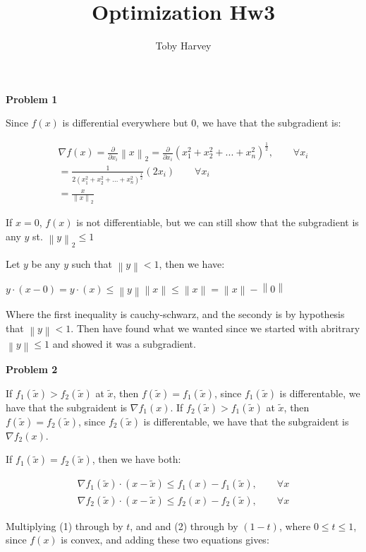 \documentclass{article}
\newcommand{\norm}[1]{\left\lVert#1\right\rVert}
\begin{document}
\title{Optimization Hw3}
\author{Toby Harvey}
\maketitle
\noindent\textbf{Problem 1}

\noindent Since $f(x)$ is differential everywhere but 0, we  have that the subgradient is:

\begin{gather*}
  \nabla f(x) = \frac{\partial}{\partial x_i}  \norm{x}_2 = \frac{\partial}{  \partial x_i} (x_1^2 + x_2^2 + ... + x_n^2)^{\frac{1}{2}}, \qquad \forall x_i\\
  = \frac{1}{2(x_1^2 + x_2^2 + ... + x_n^2)^{\frac{1}{2}}} (2x_i) \qquad \forall x_i\\
= \frac{x}{\norm{x}_2}
\end{gather*}

\noindent If $x = 0$, $f(x)$ is not differentiable, but we can still show that the subgradient is any $y$ st. $\norm{y}_2 \leq 1$

\noindent Let $y$ be any $y$ such that $\norm{y} < 1$, then we have:

$y \cdot (x - 0) = y \cdot (x) \leq \norm{y}\norm{x} \leq \norm{x} = \norm{x} - \norm{0}$

Where the first inequality is cauchy-schwarz, and the secondy is by hypothesis that $\norm{y} < 1$. Then have found what we wanted since we started with abritrary $\norm{y} \leq 1$ and showed it was a subgradient.
  
\newpage

\noindent\textbf{Problem 2}

If $f_1(\tilde{x}) > f_2(\tilde{x})$ at $\tilde{x}$, then $f(\tilde{x}) = f_1(\tilde{x})$, since $f_1(\tilde{x})$ is differentable, we have that the subgraident is $\nabla f_1(x)$. If $f_2(\tilde{x}) > f_1(\tilde{x})$ at $\tilde{x}$, then $f(\tilde{x}) =  f_2(\tilde{x})$, since $f_2(\tilde{x})$ is differentable, we have that the subgraident is $\nabla f_2(x)$.


\noindent If $f_1(\tilde{x}) = f_2(\tilde{x})$, then we have both:

\begin{gather}
  \nabla f_1(\tilde{x}) \cdot (x-\tilde{x}) \leq f_1(x) - f_1(\tilde{x}), \qquad \forall x\\
  \nabla f_2(\tilde{x}) \cdot (x-\tilde{x}) \leq f_2(x) - f_2(\tilde{x}), \qquad \forall x
\end{gather}

\noindent Multiplying (1) through by $t$, and and (2) through by $(1-t)$, where $0 \leq t \leq 1$, since $f(x)$ is convex, and adding these two equations gives:
\end{document}
